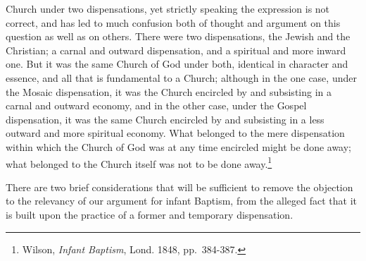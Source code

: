 \documentclass[]{book}
\begin{document}
Church under two dispensations, yet strictly speaking the expression is not correct, and has led to much confusion both of thought and argument on this question as well as on others. There were two dispensations, the Jewish and the Christian; a carnal and outward dispensation, and a spiritual and more inward one. But it was the same Church of God under both, identical in character and essence, and all that is fundamental to a Church; although in the one case, under the Mosaic dispensation, it was the Church encircled by and subsisting in a carnal and outward economy, and in the other case, under the Gospel dispensation, it was the same Church encircled by and subsisting in a less outward and more spiritual economy. What belonged to the mere dispensation within which the Church of God was at any time encircled might be done away; what belonged to the Church itself was not to be done away.\footnote{Wilson, \emph{Infant Baptism}, Lond. 1848, pp.~384-387.}

There are two brief considerations that will be sufficient to remove the objection to the relevancy of our argument for infant Baptism, from the alleged fact that it is built upon the practice of a former and temporary dispensation.
\end{document}
